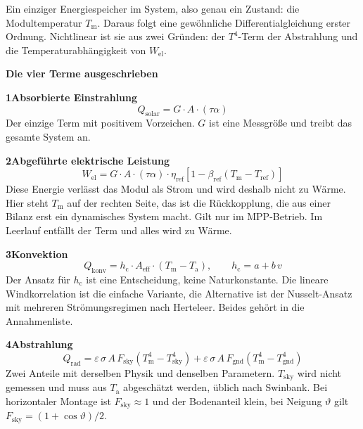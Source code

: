 \documentclass[11pt,a4paper]{article}
\newcommand{\Tm}{T_{\mathrm{m}}}
\newcommand{\Ta}{T_{\mathrm{a}}}
\begin{document}
\vspace{1.5ex}

Ein einziger Energiespeicher im System, also genau ein Zustand: die Modultemperatur
$\Tm$. Daraus folgt eine gewöhnliche Differentialgleichung erster Ordnung.
Nichtlinear ist sie aus zwei Gründen: der $T^4$-Term der Abstrahlung und die
Temperaturabhängigkeit von $W_{\mathrm{el}}$.

\newpage


{\large\bfseries Die vier Terme ausgeschrieben}

\vspace{2ex}

\textcolor{c1}{\bfseries 1\quad Absorbierte Einstrahlung}
\begin{equation*}
  Q_{\mathrm{solar}} = G \cdot A \cdot (\tau\alpha)
\end{equation*}
Der einzige Term mit positivem Vorzeichen. $G$ ist eine Messgröße und treibt das
gesamte System an.

\vspace{2ex}
\textcolor{c2}{\bfseries 2\quad Abgeführte elektrische Leistung}
\begin{equation*}
  W_{\mathrm{el}} = G \cdot A \cdot (\tau\alpha) \cdot \eta_{\mathrm{ref}}
  \left[1 - \beta_{\mathrm{ref}}\left(\Tm - T_{\mathrm{ref}}\right)\right]
\end{equation*}
Diese Energie verlässt das Modul als Strom und wird deshalb nicht zu Wärme. Hier
steht $\Tm$ auf der rechten Seite, das ist die Rückkopplung, die aus einer Bilanz
erst ein dynamisches System macht. Gilt nur im MPP-Betrieb. Im Leerlauf entfällt
der Term und alles wird zu Wärme.

\vspace{2ex}
\textcolor{c3}{\bfseries 3\quad Konvektion}
\begin{equation*}
  Q_{\mathrm{konv}} = h_{\mathrm{c}} \cdot A_{\mathrm{eff}}
  \cdot \left(\Tm - \Ta\right),
  \qquad
  h_{\mathrm{c}} = a + b\,v
\end{equation*}
Der Ansatz für $h_{\mathrm{c}}$ ist eine Entscheidung, keine Naturkonstante. Die
lineare Windkorrelation ist die einfache Variante, die Alternative ist der
Nusselt-Ansatz mit mehreren Strömungsregimen nach Herteleer. Beides gehört in die
Annahmenliste.

\vspace{2ex}
\textcolor{c4}{\bfseries 4\quad Abstrahlung}
\begin{equation*}
  Q_{\mathrm{rad}} = \varepsilon\,\sigma\,A\,F_{\mathrm{sky}}
  \left(\Tm^4 - T_{\mathrm{sky}}^4\right)
  + \varepsilon\,\sigma\,A\,F_{\mathrm{gnd}}
  \left(\Tm^4 - T_{\mathrm{gnd}}^4\right)
\end{equation*}
Zwei Anteile mit derselben Physik und denselben Parametern. $T_{\mathrm{sky}}$ wird
nicht gemessen und muss aus $\Ta$ abgeschätzt werden, üblich nach Swinbank. Bei
horizontaler Montage ist $F_{\mathrm{sky}} \approx 1$ und der Bodenanteil klein,
bei Neigung $\vartheta$ gilt $F_{\mathrm{sky}} = (1+\cos\vartheta)/2$.
\end{document}
